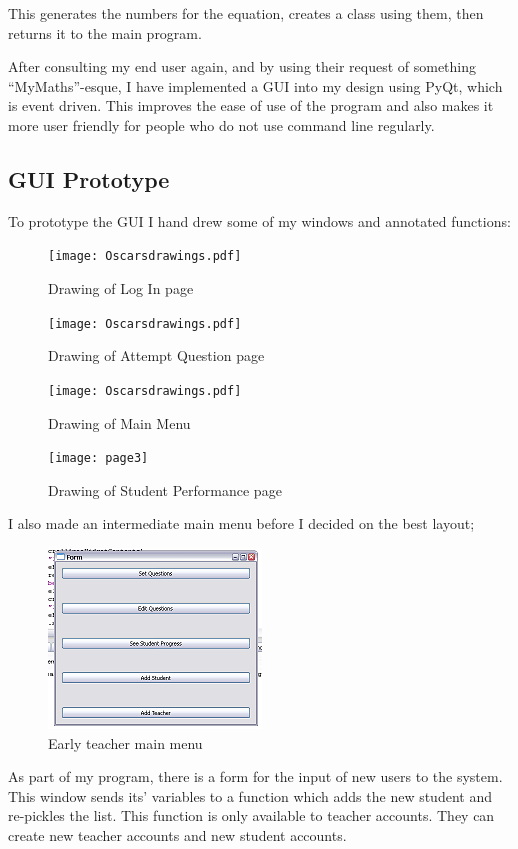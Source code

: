 \documentclass[a4paper,12pt]{report}
\begin{document}
\begin{flushleft}

This generates the numbers for the equation, creates a class using them, then returns it to the main program.
\par
After consulting my end user again, and by using their request of something “MyMaths”-esque, I have implemented a GUI into my design using PyQt, which is event driven. This improves the ease of use of the program and also makes it more user friendly for people who do not use command line regularly.

\subsection{GUI Prototype}
To prototype the GUI I hand drew some of my windows and annotated functions:
\begin{figure}[h!]
\texttt{[image: Oscarsdrawings.pdf]}
\caption{Drawing of Log In page}
\label{fig:logindrawing}
\end{figure}

\begin{figure}[h!]
\centering
\texttt{[image: Oscarsdrawings.pdf]}
\caption{Drawing of Attempt Question page}
\label{fig:attemptqdrawing}
\end{figure}

\begin{figure}[h!]
\centering
\texttt{[image: Oscarsdrawings.pdf]}
\caption{Drawing of Main Menu}
\label{fig:maindrawing}
\end{figure}

\begin{figure}[h!]
\centering
\texttt{[image: page3]}
\caption{Drawing of Student Performance page}
\label{fig:performancedrawing}
\end{figure}

\end{flushleft}
\FloatBarrier
I also made an intermediate main menu before I decided on the best layout;
\begin{figure}[h!]
\centering
\includegraphics[scale = 1.5]{MainMenuOld}
\caption{Early teacher main menu}
\end{figure}
\FloatBarrier
\bigskip
As part of my program, there is a form for the input of new users to the system. This window sends its' variables to a function which adds the new student and re-pickles the list. This function is only available to teacher accounts. They can create new teacher accounts and new student accounts.
\end{document}

